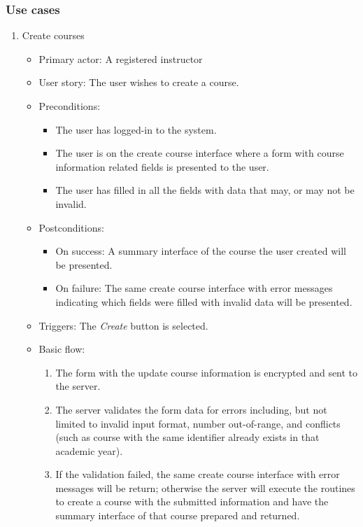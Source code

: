 \subsubsection{Use cases}
\begin{enumerate}
\item Create courses
\begin{itemize}
    \item Primary actor: A registered instructor
    \item User story: The user wishes to create a course.
    \item Preconditions: 
        \begin{itemize}
            \item The user has logged-in to the system.
            \item The user is on the create course interface where a form with
                course information related fields is presented to the user.
            \item The user has filled in all the fields with data that may, or
                may not be invalid.
        \end{itemize}
    \item Postconditions:
        \begin{itemize}
            \item On success: A summary interface of the course the user created
                will be presented.
            \item On failure: The same create course interface with error
                messages indicating which fields were filled with invalid data
                will be presented.
        \end{itemize}
    \item Triggers: The \emph{Create} button is selected.
    \item Basic flow:
        \begin{enumerate}
            \item The form with the update course information is encrypted and
                sent to the server.
            \item The server validates the form data for errors including,
                but not limited to invalid input format, number out-of-range,
                and conflicts (such as course with the same identifier  
                already exists in that academic year).
            \item If the validation failed, the same create course interface
                with error messages will be return; otherwise the server will
                execute the routines to create a course with the submitted 
                information and have the summary interface of that course prepared
                and returned.
        \end{enumerate}
\end{itemize}


\end{enumerate}
